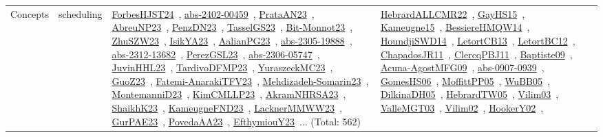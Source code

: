 {\begin{longtable}{lp{3cm}>{\raggedright\arraybackslash}p{6cm}>{\raggedright\arraybackslash}p{6cm}>{\raggedright\arraybackslash}p{8cm}}
Concepts & scheduling & \href{works/ForbesHJST24.pdf}{ForbesHJST24}~\cite{ForbesHJST24}, \href{works/abs-2402-00459.pdf}{abs-2402-00459}~\cite{abs-2402-00459}, \href{works/PrataAN23.pdf}{PrataAN23}~\cite{PrataAN23}, \href{works/AbreuNP23.pdf}{AbreuNP23}~\cite{AbreuNP23}, \href{works/PenzDN23.pdf}{PenzDN23}~\cite{PenzDN23}, \href{works/TasselGS23.pdf}{TasselGS23}~\cite{TasselGS23}, \href{works/Bit-Monnot23.pdf}{Bit-Monnot23}~\cite{Bit-Monnot23}, \href{works/ZhuSZW23.pdf}{ZhuSZW23}~\cite{ZhuSZW23}, \href{works/IsikYA23.pdf}{IsikYA23}~\cite{IsikYA23}, \href{works/AalianPG23.pdf}{AalianPG23}~\cite{AalianPG23}, \href{works/abs-2305-19888.pdf}{abs-2305-19888}~\cite{abs-2305-19888}, \href{works/abs-2312-13682.pdf}{abs-2312-13682}~\cite{abs-2312-13682}, \href{works/PerezGSL23.pdf}{PerezGSL23}~\cite{PerezGSL23}, \href{works/abs-2306-05747.pdf}{abs-2306-05747}~\cite{abs-2306-05747}, \href{works/JuvinHHL23.pdf}{JuvinHHL23}~\cite{JuvinHHL23}, \href{works/TardivoDFMP23.pdf}{TardivoDFMP23}~\cite{TardivoDFMP23}, \href{works/YuraszeckMC23.pdf}{YuraszeckMC23}~\cite{YuraszeckMC23}, \href{works/GuoZ23.pdf}{GuoZ23}~\cite{GuoZ23}, \href{works/Fatemi-AnarakiTFV23.pdf}{Fatemi-AnarakiTFV23}~\cite{Fatemi-AnarakiTFV23}, \href{works/Mehdizadeh-Somarin23.pdf}{Mehdizadeh-Somarin23}~\cite{Mehdizadeh-Somarin23}, \href{works/MontemanniD23.pdf}{MontemanniD23}~\cite{MontemanniD23}, \href{works/KimCMLLP23.pdf}{KimCMLLP23}~\cite{KimCMLLP23}, \href{works/AkramNHRSA23.pdf}{AkramNHRSA23}~\cite{AkramNHRSA23}, \href{works/ShaikhK23.pdf}{ShaikhK23}~\cite{ShaikhK23}, \href{works/KameugneFND23.pdf}{KameugneFND23}~\cite{KameugneFND23}, \href{works/LacknerMMWW23.pdf}{LacknerMMWW23}~\cite{LacknerMMWW23}, \href{works/GurPAE23.pdf}{GurPAE23}~\cite{GurPAE23}, \href{works/PovedaAA23.pdf}{PovedaAA23}~\cite{PovedaAA23}, \href{works/EfthymiouY23.pdf}{EfthymiouY23}~\cite{EfthymiouY23}... (Total: 562) & \href{works/HebrardALLCMR22.pdf}{HebrardALLCMR22}~\cite{HebrardALLCMR22}, \href{works/GayHS15.pdf}{GayHS15}~\cite{GayHS15}, \href{works/Kameugne15.pdf}{Kameugne15}~\cite{Kameugne15}, \href{works/BessiereHMQW14.pdf}{BessiereHMQW14}~\cite{BessiereHMQW14}, \href{works/HoundjiSWD14.pdf}{HoundjiSWD14}~\cite{HoundjiSWD14}, \href{works/LetortCB13.pdf}{LetortCB13}~\cite{LetortCB13}, \href{works/LetortBC12.pdf}{LetortBC12}~\cite{LetortBC12}, \href{works/ChapadosJR11.pdf}{ChapadosJR11}~\cite{ChapadosJR11}, \href{works/ClercqPBJ11.pdf}{ClercqPBJ11}~\cite{ClercqPBJ11}, \href{works/Baptiste09.pdf}{Baptiste09}~\cite{Baptiste09}, \href{works/Acuna-AgostMFG09.pdf}{Acuna-AgostMFG09}~\cite{Acuna-AgostMFG09}, \href{works/abs-0907-0939.pdf}{abs-0907-0939}~\cite{abs-0907-0939}, \href{works/GomesHS06.pdf}{GomesHS06}~\cite{GomesHS06}, \href{works/MoffittPP05.pdf}{MoffittPP05}~\cite{MoffittPP05}, \href{works/WuBB05.pdf}{WuBB05}~\cite{WuBB05}, \href{works/DilkinaDH05.pdf}{DilkinaDH05}~\cite{DilkinaDH05}, \href{works/HebrardTW05.pdf}{HebrardTW05}~\cite{HebrardTW05}, \href{works/Vilim03.pdf}{Vilim03}~\cite{Vilim03}, \href{works/ValleMGT03.pdf}{ValleMGT03}~\cite{ValleMGT03}, \href{works/Vilim02.pdf}{Vilim02}~\cite{Vilim02}, \href{works/HookerY02.pdf}{HookerY02}~\cite{HookerY02}, 
\end{longtable}}
